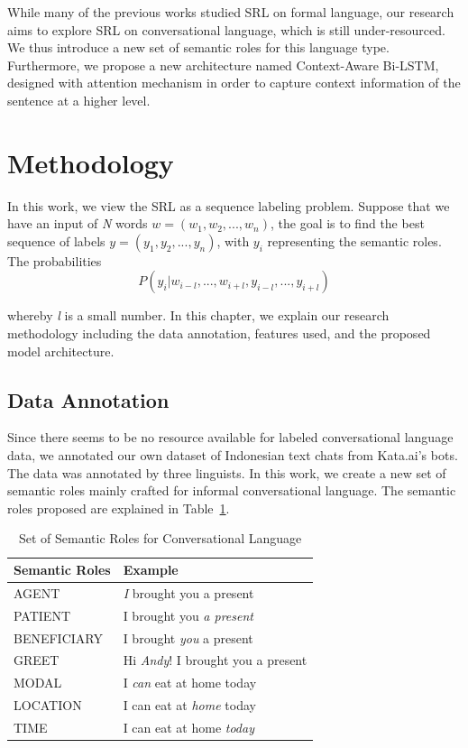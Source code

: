 While many of the previous works studied SRL on formal language, our research aims to explore SRL on conversational language, which is still under-resourced. We thus introduce a new set of semantic roles for this language type. Furthermore, we propose a new architecture named Context-Aware Bi-LSTM, designed with attention mechanism in order to capture context information of the sentence at a higher level.

\section{Methodology}
In this work, we view the SRL as a sequence labeling problem. Suppose that we have an input of \textit{N} words $w = (w_{1}, w_{2}, ..., w_{n})$, the goal is to find the best sequence of labels $y = (y_{1}, y_{2}, ..., y_{n})$, with $y_{i}$ representing the semantic roles. The probabilities
\begin{equation}
P(y_{i}|w_{i-l}, ..., w_{i+l},y_{i-l}, ..., y_{i+l})
\end{equation}

whereby \textit{l} is a small number. In this chapter, we explain our research methodology including the data annotation, features used, and the proposed model architecture. 

\subsection{Data Annotation}
Since there seems to be no resource available for labeled conversational language data, we annotated our own dataset of Indonesian text chats from Kata.ai’s bots. The data was annotated by three linguists. In this work, we create a new set of semantic roles mainly crafted for informal conversational language. The semantic roles proposed are explained in Table~\ref{tab:semantic_roles}.

\begin{table}
	\caption{Set of Semantic Roles for Conversational Language}
	\label{tab:semantic_roles}
	\begin{tabular}{ll}
		\toprule
		Semantic Roles		&Example\\
		\midrule
		AGENT				& \emph{I} brought you a present\\
		PATIENT				& I brought you \emph{a present}\\
		BENEFICIARY			& I brought \emph{you} a present\\
		GREET 				& Hi \emph{Andy}! I brought you a present\\
		MODAL 				& I \emph{can} eat at home today \\
		LOCATION 			& I can eat at \emph{home} today \\
		TIME 				& I can eat at home \emph{today} \\
		\bottomrule
	\end{tabular}
\end{table}

